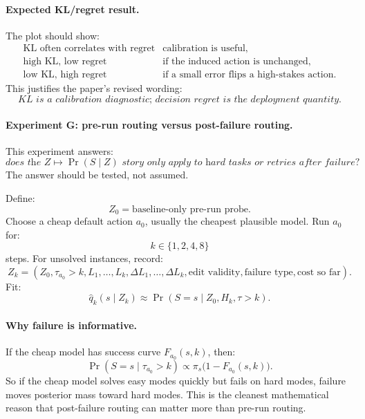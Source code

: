 \documentclass{article}
\begin{document}
\paragraph{Expected KL/regret result.}
The plot should show:
\[
\begin{array}{ll}
    \text{KL often correlates with regret} & \text{calibration is useful},\\
    \text{high KL, low regret} & \text{if the induced action is unchanged},\\
    \text{low KL, high regret} & \text{if a small error flips a high-stakes action}.
\end{array}
\]
This justifies the paper's revised wording:
\[
    \textit{KL is a calibration diagnostic; decision regret is the deployment quantity.}
\]

\paragraph{Experiment G: pre-run routing versus post-failure routing.}
This experiment answers:
\[
    \textit{does the \(Z\mapsto\Pr(S\mid Z)\) story only apply to hard tasks
    or retries after failure?}
\]
The answer should be tested, not assumed.

Define:
\[
    Z_0=\text{baseline-only pre-run probe}.
\]
Choose a cheap default action \(a_0\), usually the cheapest plausible model.
Run \(a_0\) for:
\[
    k\in\{1,2,4,8\}
\]
steps.
For unsolved instances, record:
\[
    Z_k
    =
    \left(
    Z_0,
    \tau_{a_0}>k,
    L_1,\ldots,L_k,
    \Delta L_1,\ldots,\Delta L_k,
    \text{edit validity},
    \text{failure type},
    \text{cost so far}
    \right).
\]
Fit:
\[
    \hat q_k(s\mid Z_k)
    \approx
    \Pr(S=s\mid Z_0,H_k,\tau>k).
\]

\paragraph{Why failure is informative.}
If the cheap model has success curve \(F_{a_0}(s,k)\), then:
\[
    \Pr(S=s\mid \tau_{a_0}>k)
    \propto
    \pi_s\bigl(1-F_{a_0}(s,k)\bigr).
\]
So if the cheap model solves easy modes quickly but fails on hard modes, failure moves
posterior mass toward hard modes.
This is the cleanest mathematical reason that post-failure routing can matter more than
pre-run routing.
\end{document}
